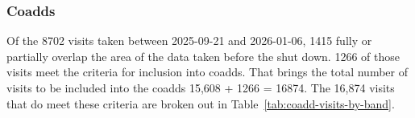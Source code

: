 \subsubsection{Coadds}

Of the 8702 visits taken between 2025-09-21 and 2026-01-06, 1415 fully or partially overlap the area of the
data taken before the shut down. 1266 of those visits meet the criteria for inclusion into coadds.
That brings the total number of visits to be included into the coadds
15,608 + 1266 = 16874.
The 16,874 visits that do meet these criteria are broken out in Table~\ref{tab:coadd-visits-by-band}.


 \begin{table}[ht]
\centering
\caption{Deep coadd quality visit counts by target and band if including data taken after 2025-09-21}
\label{tab:coadd-visits-by-band-updated}
\renewcommand{\arraystretch}{1.1}


\end{table}
